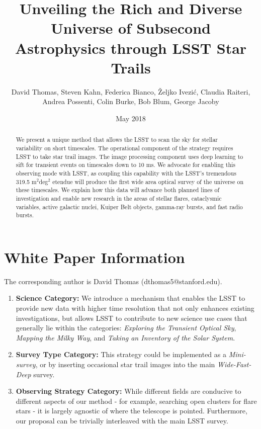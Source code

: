 \documentclass[12pt, letterpaper]{article}
\title{Unveiling the Rich and Diverse Universe of Subsecond Astrophysics through LSST Star Trails}
\author{David Thomas, Steven Kahn, Federica Bianco, Željko Ivezić, Claudia Raiteri, \\Andrea Possenti, Colin Burke, Bob Blum, George Jacoby}
\date{May 2018}
\begin{document}
\maketitle

\begin{abstract}
We present a unique method that allows the LSST to scan the sky for stellar variability on short timescales.
The operational component of the strategy requires LSST to take star trail images. The image processing component uses deep learning to sift for transient events on timescales down to 10 ms. We advocate for enabling this observing mode with LSST, as coupling this capability with the LSST's tremendous 319.5 m$^2$deg$^2$ etendue will produce the first wide area optical survey of the universe on these timescales. We explain how this data will advance both planned lines of investigation and enable new research in the areas of stellar flares, cataclysmic variables, active galactic nuclei, Kuiper Belt objects, gamma-ray bursts, and fast radio bursts.
\end{abstract}

\section{White Paper Information}
The corresponding author is David Thomas (dthomas5@stanford.edu).

\begin{enumerate} 
\item {\bf Science Category:} We introduce a mechanism that enables the LSST to provide new data with higher time resolution that not only enhances existing investigations, but allows LSST to contribute to new science use cases that generally lie within the categories: \textit{Exploring the Transient Optical Sky}, \textit{Mapping the Milky Way}, and \textit{Taking an Inventory of the Solar System}.

\item {\bf Survey Type Category:} This strategy could be implemented as a \emph{Mini-survey}, or by inserting occasional star trail images into the main \textit{Wide-Fast-Deep} survey.

\item {\bf Observing Strategy Category:}
While different fields are conducive to different aspects of our method - for example, searching open clusters for flare stars - it is largely agnostic of where the telescope is pointed. Furthermore, our proposal can be trivially interleaved with the main LSST survey.

\end{enumerate}  
\end{document}
